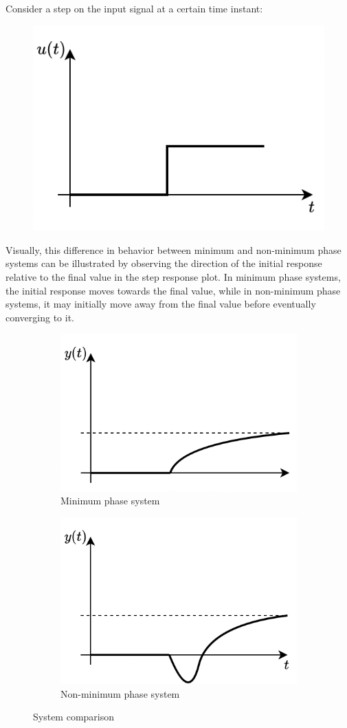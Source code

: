 Consider a step on the input signal at a certain time instant: 
\begin{figure}[H]
    \centering
    \includegraphics[width=0.4\linewidth]{images/phase.png}
\end{figure}
Visually, this difference in behavior between minimum and non-minimum phase systems can be illustrated by observing the direction of the initial response relative to the final value in the step response plot. 
In minimum phase systems, the initial response moves towards the final value, while in non-minimum phase systems, it may initially move away from the final value before eventually converging to it.
\begin{figure}[H]
    \centering
    \begin{subfigure}{0.49\textwidth}
        \centering
        \includegraphics[width=0.75\linewidth]{images/phase1.png} 
        \caption{Minimum phase system}
    \end{subfigure}
    \begin{subfigure}{0.49\textwidth}
        \centering
        \includegraphics[width=0.75\linewidth]{images/phase2.png}
        \caption{Non-minimum phase system}
    \end{subfigure}
    \caption{System comparison}
\end{figure}